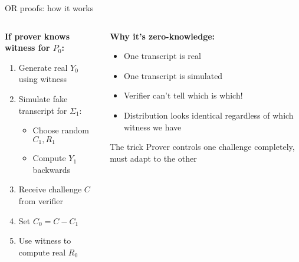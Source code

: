 \documentclass[aspectratio=169, lualatex, handout]{beamer}
\begin{document}
\begin{frame}{OR proofs: how it works}
	\begin{columns}[c]
		\begin{column}{0.5\textwidth}
			\textbf{If prover knows witness for $P_0$:}
			\begin{enumerate}
				\item Generate real $Y_0$ using witness
				\item Simulate fake transcript for $\Sigma_1$:
				      \begin{itemize}
					      \item Choose random $C_1, R_1$
					      \item Compute $Y_1$ backwards
				      \end{itemize}
				\item Receive challenge $C$ from verifier
				\item Set $C_0 = C - C_1$
				\item Use witness to compute real $R_0$
			\end{enumerate}
		\end{column}
		\begin{column}{0.5\textwidth}
			\textbf{Why it's zero-knowledge:}
			\begin{itemize}
				\item One transcript is real
				\item One transcript is simulated
				\item Verifier can't tell which is which!
				\item Distribution looks identical regardless of which witness we have
			\end{itemize}
			\vspace{0.5em}
			\begin{alertblock}{The trick}
				Prover controls one challenge completely, must adapt to the other
			\end{alertblock}
		\end{column}
	\end{columns}
\end{frame}
\end{document}
